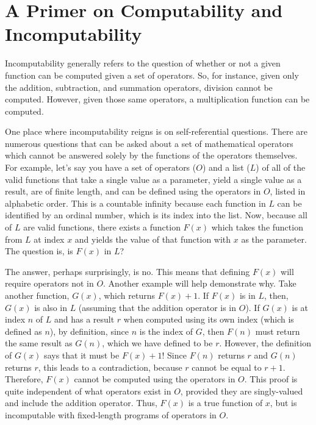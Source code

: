 \section[A Primer on Computability]{A Primer on Computability and Incomputability}

Incomputability generally refers to the question of whether or not a given function can be computed given a set of operators.  So, for instance, given only the addition, subtraction, and summation operators, division cannot be computed.  However, given those same operators, a multiplication function can be computed.  

One place where incomputability reigns is on self-referential questions.  There are numerous questions that can be asked about a set of mathematical operators which cannot be answered solely by the functions of the operators themselves.  For example, let's say you have a set of operators ($O$) and a list ($L$) of all of the valid functions that take a single value as a parameter, yield a single value as a result, are of finite length, and can be defined using the operators in $O$, listed in alphabetic order.  This is a countable infinity because each function in $L$ can be identified by an ordinal number, which is its index into the list.  Now, because all of $L$ are valid functions, there exists a function $F(x)$ which takes the function from $L$ at index $x$ and yields the value of that function with $x$ as the parameter.  The question is, is $F(x)$ in $L$?  

The answer, perhaps surprisingly, is no.  This means that defining $F(x)$ will require operators not in $O$.  Another example will help demonstrate why. Take another function, $G(x)$, which returns $F(x) + 1$.  If $F(x)$ is in $L$, then, $G(x)$ is also in $L$ (assuming that the addition operator is in $O$).  If $G(x)$ is at index $n$ of $L$ and has a result $r$ when computed using its own index (which is defined as $n$), by definition, since $n$ is the index of $G$, then $F(n)$ must return the same result as $G(n)$, which we have defined to be $r$.  However, the definition of $G(x)$ says that it must be $F(x) + 1$!  Since $F(n)$ returns $r$ and $G(n)$ returns $r$, this leads to a contradiction, because $r$ cannot be equal to $r + 1$.  Therefore, $F(x)$ cannot be computed using the operators in $O$.  This proof is quite independent of what operators exist in $O$, provided they are singly-valued and include the addition operator.  Thus, $F(x)$ is a true function of $x$, but is incomputable with fixed-length programs of operators in $O$.

